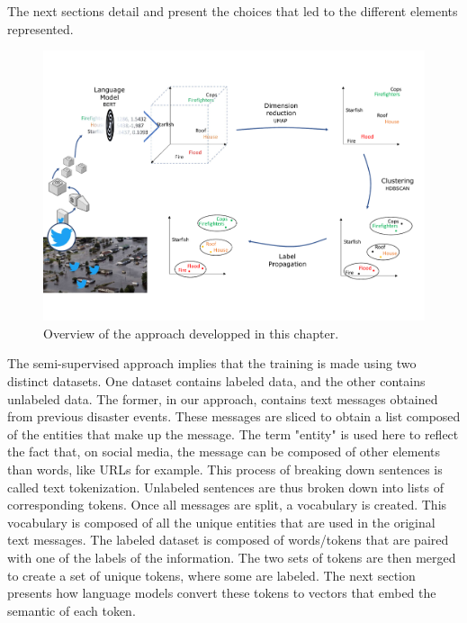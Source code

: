 The next sections detail and present the choices that led to the different elements represented.

\begin{figure}[htb]
    \centering
    \includegraphics[width=\textwidth]{figures/chap-4/big-picture.pdf}
    \caption{Overview of the approach developped in this chapter.}
    \label{processing:big-picture}
\end{figure}

The semi-supervised approach implies that the training is made using two distinct datasets.
One dataset contains labeled data, and the other contains unlabeled data.
The former, in our approach, contains text messages obtained from previous disaster events.
These messages are sliced to obtain a list composed of the entities that make up the message.
The term "entity" is used here to reflect the fact that, on social media, the message can be composed of other elements than words, like URLs for example.
This process of breaking down sentences is called text tokenization.
Unlabeled sentences are thus broken down into lists of corresponding tokens.
Once all messages are split, a vocabulary is created.
This vocabulary is composed of all the unique entities that are used in the original text messages.
The labeled dataset is composed of words/tokens that are paired with one of the labels of the information.
The two sets of tokens are then merged to create a set of unique tokens, where some are labeled.
The next section presents how language models convert these tokens to vectors that embed the semantic of each token.

